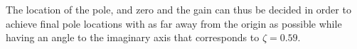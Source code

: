 The location of the pole, and zero and the gain can thus be decided in order to achieve final pole locations with as far away from the origin as possible while having an angle to the imaginary axis that corresponds to $\zeta=0.59$.



